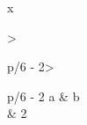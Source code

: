 \documentclass[twocolumn]{article}
\begin{document}
x
\begin{table}[t]
\centering\small
\begin{tabular}>{\raggedright\arraybackslash}p{\dimexpr \textwidth/6 - 2\tabcolsep\relax}>{\raggedright\arraybackslash}p{\dimexpr \textwidth/6 - 2\tabcolsep\relax}
\toprule
a & b \\
 & 2 \\
\bottomrule
\end{tabular}
\end{table}
\end{document}
